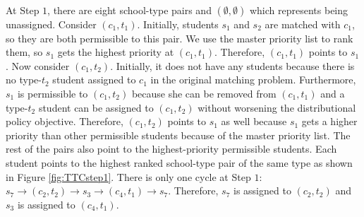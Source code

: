 \documentclass[12pt]{amsart}
\theoremstyle{remark}
\begin{document}
At Step $1$, there are eight school-type pairs and $(\emptyset,\emptyset)$ which represents being unassigned. Consider $(c_1,t_1)$. Initially, students $s_1$ and $s_2$ are matched with $c_1$, so they are both permissible to this pair. We use the master priority list to rank them, so $s_1$ gets the highest priority at $(c_1,t_1)$. Therefore, $(c_1,t_1)$ points to $s_1$. Now consider $(c_1,t_2)$. Initially, it does not have any students because there is no type-$t_2$ student assigned to $c_1$ in the original matching problem. Furthermore, $s_1$ is permissible to
$(c_1,t_2)$ because she can be removed from $(c_1,t_1)$ and a type-$t_2$ student can be assigned to $(c_1,t_2)$ without worsening the distributional policy objective. Therefore, $(c_1,t_2)$ points to $s_1$ as well because $s_1$ gets a higher priority than other permissible students because of the master priority list. The rest of the pairs also point to the highest-priority permissible students. Each student points to the highest ranked school-type pair of the same type as shown in Figure \ref{fig:TTCstep1}. There is only one cycle at Step $1$: $s_7 \rightarrow (c_2,t_2) \rightarrow s_3 \rightarrow (c_4,t_1) \rightarrow s_7$. Therefore, $s_7$ is assigned to $(c_2,t_2)$ and $s_3$ is assigned to $(c_4,t_1)$.
\end{document}
